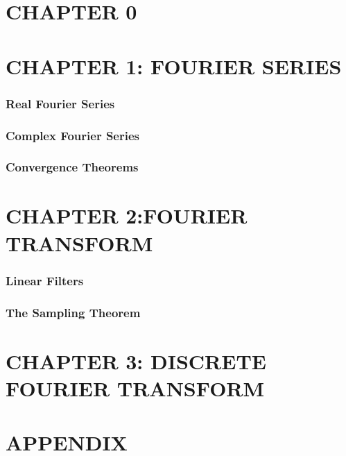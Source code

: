 \documentclass[a4paper]{article}
\begin{document}
\fontsize{10.5}{6}
\selectfont
\begin{multicols}{2}
\section*{CHAPTER 0}






\section*{CHAPTER 1: FOURIER SERIES}
\subsubsection*{Real Fourier Series}


\subsubsection*{Complex Fourier Series}

\subsubsection*{Convergence Theorems}









\section*{CHAPTER 2:FOURIER TRANSFORM}

\newline



\subsubsection*{Linear Filters}





\subsubsection*{The Sampling Theorem}



\section*{CHAPTER 3: DISCRETE FOURIER TRANSFORM}


\newline


\section*{APPENDIX}


\end{multicols}
\end{document}
